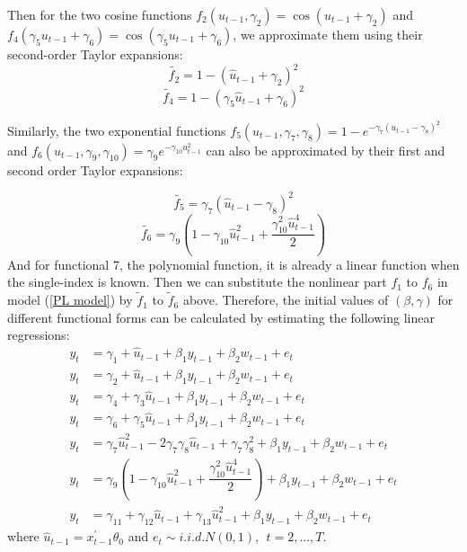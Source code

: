 \documentclass[a4paper,12pt,times,numbered,print,index]{report}
\numberwithin{equation}{section}
\begin{document}
Then for the two cosine functions $f_{2}\left( u_{t-1},\gamma _{2}\right) =\cos \left(u_{t-1}+\gamma_{2}\right)$ and $f_{4}\left( \gamma _{5}u_{t-1}+\gamma_{6}\right) =\cos \left( \gamma_{5}u_{t-1}+\gamma_{6}\right)$, we approximate them using their second-order Taylor expansions:
$$
\tilde{f_2} = 1 - \left( \hat{u}_{t-1}+\gamma_{2}\right)^2
$$ 
$$
\tilde{f_4} =  1 - \left(\gamma _{5} \hat{u}_{t-1}+\gamma_{6}\right)^2
$$ 

Similarly, the two exponential functions $f_{5}\left( u_{t-1}, \gamma_{7}, \gamma_{8}\right) = 1-e^{-\gamma_{7}\left(u_{t-1}-\gamma_{8}\right)^{2}}$ and $f_{6}\left( u_{t-1},\gamma _{9}, \gamma_{10}\right) = \gamma_{9} e^{-\gamma_{10}u_{t-1}^2}$ can also be approximated by their first and second order Taylor expansions:

$$
\tilde{f_5} = \gamma_{7}(\hat{u}_{t-1} - \gamma_{8})^2
$$
$$
\tilde{f_6}= \gamma_{9}(1-\gamma_{10}\hat{u}_{t-1}^2 + \dfrac{\gamma_{10}^2 \hat{u}_{t-1}^4}{2})
$$
And for functional 7, the polynomial function, it is already a linear function when the single-index is known. Then we can substitute the nonlinear part $f_1$ to $f_6$ in model (\ref{PL model}) by $\tilde{f}_1$ to $\tilde{f}_6$ above. Therefore, the initial values of $( \beta, \gamma)$ for different functional forms can be calculated by estimating the following linear regressions:
\begin{align*}
	y_{t} & =  \gamma_{1}  + \hat{u}_{t-1} + \beta_{1}y_{t-1} + \beta_2w_{t-1} + e_t \\
	y_{t} & =  \gamma_{2}  + \hat{u}_{t-1} + \beta_{1}y_{t-1} + \beta_2w_{t-1} + e_t \\
	y_{t} & =  \gamma_{4}  + \gamma_{3}\hat{u}_{t-1} + \beta_{1}y_{t-1} + \beta_2w_{t-1} + e_t\\	
	y_{t} & =  \gamma_{6}  + \gamma_{5}\hat{u}_{t-1} + \beta_{1}y_{t-1} + \beta_2w_{t-1} + e_t \\
	y_{t} & =  \gamma_{7}\hat{u}_{t-1}^2 - 2\gamma_{7}\gamma_{8}\hat{u}_{t-1} + \gamma_{7}\gamma_{8}^2 + \beta_{1}y_{t-1} + \beta_2w_{t-1} + e_t \\
	y_{t} & =  \gamma_{9}(1-\gamma_{10}\hat{u}_{t-1}^2 + \dfrac{\gamma_{10}^2 \hat{u}_{t-1}^4}{2}) + \beta_{1}y_{t-1} + \beta_2w_{t-1} + e_t \\
	y_{t} & =  \gamma_{11}+ \gamma_{12}\hat{u}_{t-1}+\gamma_{13}\hat{u}_{t-1}^{2} +\beta_{1}y_{t-1} + \beta_2w_{t-1} + e_t
\end{align*}
where $\hat{u}_{t-1} = x^{\prime}_{t-1}\theta_0$ and $e_{t}\sim i.i.d.N\left( 0,1\right) ,\ \ t=2,...,T$.
\end{document}
